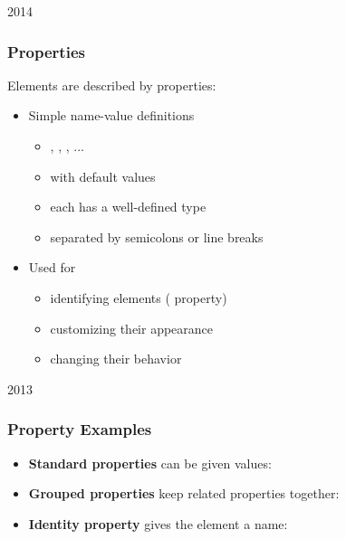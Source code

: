 \begin{slide}{2014}\frametitle{Properties}

Elements are described by properties:

\begin{itemize}
\item Simple name-value definitions
  \begin{itemize}
  \item {}, , , ...
  \item with default values
  \item each has a well-defined type
  \item separated by semicolons or line breaks
  \end{itemize}
  \vspace*{0.5em}
\item Used for
  \begin{itemize}
  \item identifying elements ( property)
  \item customizing their appearance
  \item changing their behavior
  \end{itemize}
  \vspace*{0.5em}
\end{itemize}

\end{slide}


\begin{slide}{2013}\frametitle{Property Examples}

\begin{itemize}
\item \textbf{Standard properties} can be given values:

\vspace*{0.25em}

\vspace*{0.5em}
\item \textbf{Grouped properties} keep related properties together:

\vspace*{0.25em}

\vspace*{0.5em}
\item \textbf{Identity property} gives the element a name:

\vspace*{0.25em}
\end{itemize}

\end{slide}

